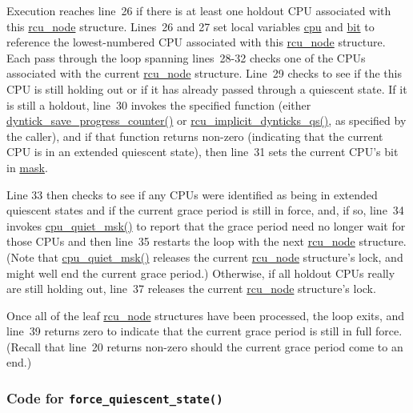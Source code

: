 Execution reaches line~26 if there is at least one holdout CPU associated
with this \url{rcu_node} structure.
Lines~26 and 27 set local variables \url{cpu} and \url{bit} to reference
the lowest-numbered CPU associated with this \url{rcu_node} structure.
Each pass through the loop spanning lines~28-32 checks one of the
CPUs associated with the current \url{rcu_node} structure.
Line~29 checks to see if the this CPU is still holding out or if
it has already passed through a quiescent state.
If it is still a holdout, line~30 invokes the specified function
(either \url{dyntick_save_progress_counter()} or
\url{rcu_implicit_dynticks_qs()}, as specified by the caller), and
if that function returns non-zero (indicating that the current CPU
is in an extended quiescent state), then line~31 sets the current
CPU's bit in \url{mask}.

Line 33 then checks to see if any CPUs were identified as being
in extended quiescent states and if the current grace period is
still in force, and, if so, line~34 invokes \url{cpu_quiet_msk()}
to report that the grace period need no longer wait for those
CPUs and then line~35 restarts the loop with the next \url{rcu_node}
structure.
(Note that \url{cpu_quiet_msk()} releases the current \url{rcu_node}
structure's lock, and might well end the current grace period.)
Otherwise, if all holdout CPUs really are still holding out, line~37
releases the current \url{rcu_node} structure's lock.

Once all of the leaf \url{rcu_node} structures have been processed,
the loop exits, and line~39 returns zero to indicate that the current
grace period is still in full force.
(Recall that line~20 returns non-zero should the current grace period
come to an end.)

\subsubsection{Code for {\tt force\_quiescent\_state()}}
\label{app:rcuimpl:rcutreewt:Code for force-quiescent-state}

